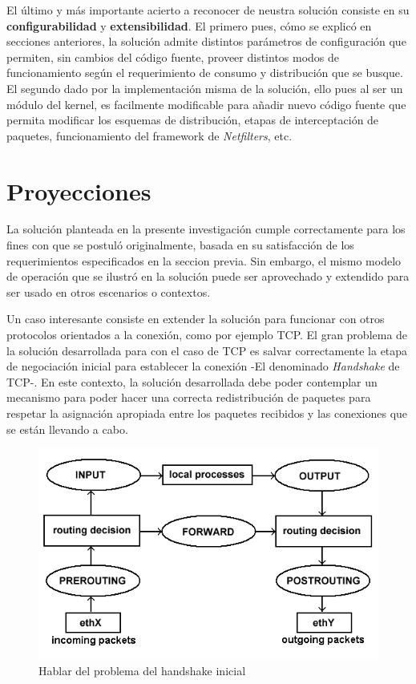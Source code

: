 El último y más importante acierto a reconocer de neustra solución consiste en su \textbf{configurabilidad} y \textbf{extensibilidad}. El primero pues, cómo se explicó en secciones anteriores, la solución admite distintos parámetros de configuración que permiten, sin cambios del código fuente, proveer distintos modos de funcionamiento según el requerimiento de consumo y distribución que se busque. El segundo dado por la implementación misma de la solución, ello pues al ser un módulo del kernel, es facilmente modificable para añadir nuevo código fuente que permita modificar los esquemas de distribución, etapas de interceptación de paquetes, funcionamiento del framework de \emph{Netfilters}, etc.

\section{Proyecciones}
La solución planteada en la presente investigación cumple correctamente para los fines con que se postuló originalmente, basada en su satisfacción de los requerimientos especificados en la seccion previa. Sin embargo, el mismo modelo de operación que se ilustró en la solución puede ser aprovechado y extendido para ser usado en otros escenarios o contextos.

Un caso interesante consiste en extender la solución para funcionar con otros protocolos orientados a la conexión, como por ejemplo TCP. El gran problema de la solución desarrollada para con el caso de TCP es salvar correctamente la etapa de negociación inicial para establecer la conexión -El denominado \emph{Handshake} de TCP-. En este contexto, la solución desarrollada debe poder contemplar un mecanismo para poder hacer una correcta redistribución de paquetes para respetar la asignación apropiada entre los paquetes recibidos y las conexiones que se están llevando a cabo.

\begin{figure}[!h]
	\centering
	\includegraphics[scale=.2]{imagenes/netfilterArchitecture}
	\caption{Hablar del problema del handshake inicial}
	\label{netfilterArchitecture}
\end{figure}

